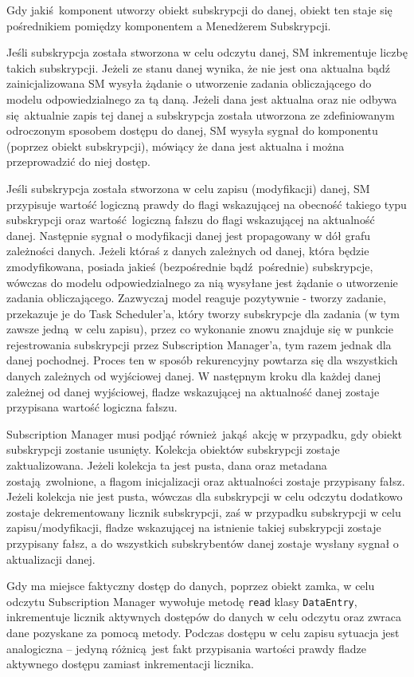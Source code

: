 Gdy jakiś komponent utworzy obiekt subskrypcji do danej, obiekt ten staje się pośrednikiem pomiędzy komponentem a Menedżerem Subskrypcji. 

Jeśli subskrypcja została stworzona w celu odczytu danej, SM inkrementuje liczbę takich subskrypcji. Jeżeli ze stanu danej wynika, że nie jest ona aktualna bądź zainicjalizowana SM wysyła żądanie o utworzenie zadania obliczającego do modelu odpowiedzialnego za tą daną. Jeżeli dana jest aktualna oraz nie odbywa się aktualnie zapis tej danej a subskrypcja została utworzona ze zdefiniowanym odroczonym sposobem dostępu do danej, SM wysyła sygnał do komponentu (poprzez obiekt subskrypcji), mówiący że dana jest aktualna i można przeprowadzić do niej dostęp.

Jeśli subskrypcja została stworzona w celu zapisu (modyfikacji) danej, SM przypisuje wartość logiczną prawdy do flagi wskazującej na obecność takiego typu subskrypcji oraz wartość logiczną fałszu do flagi wskazującej na aktualność danej. Następnie sygnał o modyfikacji danej jest propagowany w dół grafu zależności danych. Jeżeli któraś z danych zależnych od danej, która będzie zmodyfikowana, posiada jakieś (bezpośrednie bądź pośrednie) subskrypcje, wówczas do modelu odpowiedzialnego za nią wysyłane jest żądanie o utworzenie zadania obliczającego. Zazwyczaj model reaguje pozytywnie - tworzy zadanie, przekazuje je do Task Scheduler'a, który tworzy subskrypcje dla zadania (w tym zawsze jedną w celu zapisu), przez co wykonanie znowu znajduje się w punkcie rejestrowania subskrypcji 
przez Subscription Manager'a, tym razem jednak dla danej pochodnej. Proces ten w sposób rekurencyjny powtarza się dla wszystkich danych zależnych od wyjściowej danej. W następnym kroku dla każdej danej zależnej od danej wyjściowej, fladze wskazującej na aktualność danej zostaje przypisana wartość logiczna fałszu.

Subscription Manager musi podjąć również jakąś akcję w przypadku, gdy obiekt subskrypcji zostanie usunięty. Kolekcja obiektów subskrypcji zostaje zaktualizowana. Jeżeli kolekcja ta jest pusta, dana oraz metadana zostają zwolnione, a flagom inicjalizacji oraz aktualności zostaje przypisany fałsz.
Jeżeli kolekcja nie jest pusta, wówczas dla subskrypcji w celu odczytu dodatkowo zostaje dekrementowany licznik subskrypcji, zaś w przypadku subskrypcji w celu zapisu/modyfikacji, fladze wskazującej na istnienie takiej subskrypcji zostaje przypisany fałsz, a do wszystkich subskrybentów danej zostaje wysłany sygnał o aktualizacji danej.

Gdy ma miejsce faktyczny dostęp do danych, poprzez obiekt zamka, w celu odczytu Subscription Manager wywołuje metodę \lstinline$read$ klasy \lstinline$DataEntry$, inkrementuje licznik aktywnych dostępów do danych w celu odczytu oraz zwraca dane pozyskane za pomocą metody. Podczas dostępu w celu zapisu sytuacja jest analogiczna -- jedyną różnicą jest fakt przypisania wartości prawdy fladze aktywnego dostępu zamiast inkrementacji licznika. 

